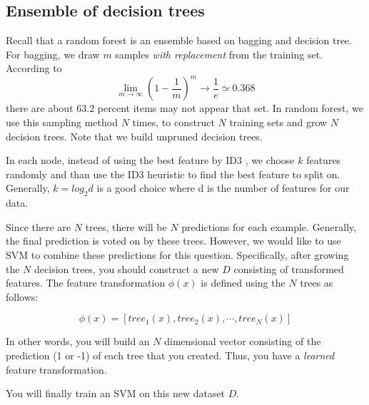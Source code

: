 \subsection{Ensemble of decision trees}

Recall that a random forest is an ensemble based on bagging and
decision tree. For bagging, we draw $m$ samples {\em with replacement}
from the training set. According to
$$\lim_{m \to \infty}(1-\frac{1}{m})^m \to \frac{1}{e} \simeq 0.368$$
there are about $63.2 $ percent items may not appear that set. In
random forest, we use this sampling method $N$ times, to construct $N$
training sets and grow $N$ decision trees. Note that we build unpruned
decision trees.

In each node, instead of using the best feature by ID3 , we choose $k$
features randomly and than use the ID3 heuristic to find the best
feature to split on. Generally, $k = log_2 d $ is a good choice where d
is the number of features for our data.

Since there are $N$ trees, there will be $N$ predictions for each
example. Generally, the final prediction is voted on by these trees.
However, we would like to use SVM to combine these predictions for
this question. Specifically, after growing the $N$ decision trees, you
should construct a new $D$ consisting of transformed features. The
feature transformation $\phi(x)$ is defined using the $N$ trees as
follows:

$$\phi(x) = [tree_1(x), tree_2(x), \cdots, tree_{N} (x)]$$  

In other words, you will build an $N$ dimensional vector consisting of
the prediction (1 or -1) of each tree that you created. Thus, you have
a {\em learned} feature transformation.

You will finally train an SVM on this new dataset $D$.

